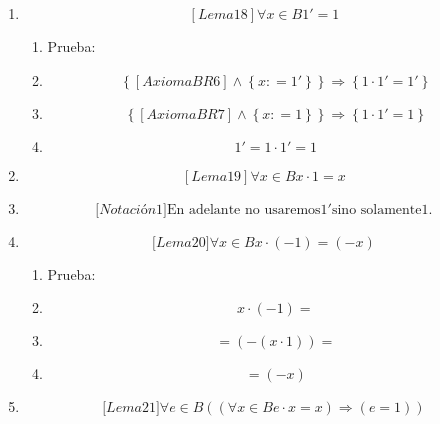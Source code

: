 \begin{enumerate}
\begin{enumerate}
\begin{enumerate}
\begin{enumerate}
        \begin{enumerate}
        \def\labelenumv{\arabic{enumv}.}
        \tightlist
        \item
          Prueba:
        \item
          \[\left( {\left( {- 1} \right) \cdot x} \right) \oplus {x =}\]
        \item
          \[{= \left( {\left( {- 1} \right) \cdot x} \right)} \oplus {\left( {1 \cdot x} \right) =}\]
        \item
          \[{= {\left( {\left( {- 1} \right) \oplus 1} \right) \cdot x}} =\]
        \item
          \[{= {0 \cdot x}} =\]
        \item
          \[= 0\]
        \end{enumerate}
      \item
        \[\left\lbrack {{Lema}18} \right\rbrack\forall{x \in B}1{' = 1}\]

        \begin{enumerate}
        \def\labelenumv{\arabic{enumv}.}
        \tightlist
        \item
          Prueba:
        \item
          \[\left\{ {\left\lbrack {{Axioma}{BR6}} \right\rbrack \land \left\{ {x{: = 1}'} \right\}} \right\}\Rightarrow\left\{ {{1 \cdot 1}{' = 1}'} \right\}\]
        \item
          \[\left\{ {\left\lbrack {{Axioma}{BR7}} \right\rbrack \land \left\{ {x{: = 1}} \right\}} \right\}\Rightarrow\left\{ {{1 \cdot 1}{' = 1}} \right\}\]
        \item
          \[1{' = {1 \cdot 1}}{' = 1}\]
        \end{enumerate}
      \item
        \[\left\lbrack {{Lema}19} \right\rbrack\forall{x \in B}{{x \cdot 1} = x}\]
      \item
        \[{\lbrack{{Notación}1}\rbrack}\text{En adelante no usaremos}1'\text{sino solamente}1\text{.}\]
      \item
        \[{\lbrack{{Lema}20}\rbrack}\forall{x \in B}{{x \cdot \left( {- 1} \right)} = \left( {- x} \right)}\]

        \begin{enumerate}
        \def\labelenumv{\arabic{enumv}.}
        \tightlist
        \item
          Prueba:
        \item
          \[{x \cdot \left( {- 1} \right)} =\]
        \item
          \[{= \left( {- \left( {x \cdot 1} \right)} \right)} =\]
        \item
          \[= \left( {- x} \right)\]
        \end{enumerate}
      \item
        \[{\lbrack{{Lema}21}\rbrack}\forall{e \in B}\left( {\left( {\forall{x \in B}{{e \cdot x} = x}} \right)\Rightarrow\left( {e = 1} \right)} \right)\]


\end{enumerate}
\end{enumerate}
\end{enumerate}
\end{enumerate}

